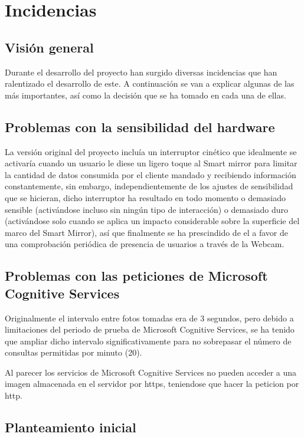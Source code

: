 \chapter{Incidencias}

\section{Visión general}

Durante el desarrollo del proyecto han surgido diversas incidencias que han ralentizado el desarrollo de este. A continuación se van a explicar algunas de las más importantes, así como la decisión que se ha tomado en cada una de ellas.

\section{Problemas con la sensibilidad del hardware}

La versión original del proyecto incluía un interruptor cinético que idealmente se activaría cuando un usuario le diese un ligero toque al Smart mirror para limitar la cantidad de datos consumida por el cliente mandado y recibiendo información constantemente, sin embargo, independientemente de los ajustes de sensibilidad que se hicieran, dicho interruptor ha resultado en todo momento o demasiado sensible (activándose incluso sin ningún tipo de interacción) o demasiado duro (activándose solo cuando se aplica un impacto considerable sobre la superficie del marco del Smart Mirror), así que finalmente se ha prescindido de el a favor de una comprobación periódica de presencia de usuarios a través de la Webcam.

\section{Problemas con las peticiones de Microsoft Cognitive Services}

Originalmente el intervalo entre fotos tomadas era de 3 segundos, pero debido a limitaciones del periodo de prueba de Microsoft Cognitive Services, se ha tenido que ampliar dicho intervalo significativamente para no sobrepasar el número de consultas permitidas por minuto (20).

Al parecer los servicios de Microsoft Cognitive Services no pueden acceder a una imagen almacenada en el servidor por \acrshort{https}, teniendose que hacer la peticion por \acrshort{http}.

\section{Planteamiento inicial}

